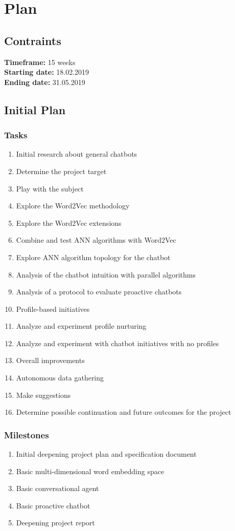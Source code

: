 \chapter{Plan}


\section{Contraints}
\textbf{Timeframe:} 15 weeks\\
\textbf{Starting date:} 18.02.2019\\
\textbf{Ending date:} 31.05.2019

\section{Initial Plan}
\subsection{Tasks}
\begin{enumerate}
	\setlength\itemsep{0em}
	\item Initial research about general chatbots
	\item Determine the project target
	\item Play with the subject
	\item Explore the Word2Vec methodology
	\item Explore the Word2Vec extensions
	\item Combine and test ANN algorithms with Word2Vec
	\item Explore ANN algorithm topology for the chatbot
	\item Analysis of the chatbot intuition with parallel algorithms
	\item Analysis of a protocol to evaluate proactive chatbots
	\item Profile-based initiatives
	\item Analyze and experiment profile nurturing 
	\item Analyze and experiment with chatbot initiatives with no profiles
	\item Overall improvements
	\item Autonomous data gathering
	\item Make suggestions
	\item Determine possible continuation and future outcomes for the project
\end{enumerate}

\subsection{Milestones}
\begin{enumerate}
	\setlength\itemsep{0em}
	\item Initial deepening project plan and specification document
	\item Basic multi-dimensional word embedding space
	\item Basic conversational agent
	\item Basic proactive chatbot
	\item Deepening project report
\end{enumerate}

